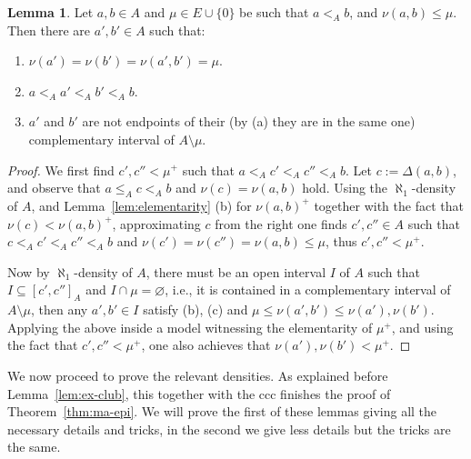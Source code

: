 \documentclass[10pt]{amsart}
\theoremstyle{definition}
\newtheorem{lemma}[theorem]{Lemma}
\theoremstyle{remark}
\newcommand{\es}{\varnothing}
\newcommand{\seb}{\subseteq}
\newcommand{\setm}{\setminus}
\newcommand{\1}{\mathbbm{1}}
\begin{document}
\begin{lemma}\label{lem:tech-lemma}
  Let $a,b \in A$ and $\mu \in E \cup \{0\}$ be such that
  $a <_{A} b$, and $\nu(a,b) \le \mu$. Then there are
  $a',b'\in A$ such that:
  \begin{enumerate}[label=(\alph*)]\itemsep0em
    \item $\nu(a') = \nu(b') = \nu(a',b') = \mu$.
    \item $a <_{A} a' <_{A} b' <_{A} b$.
    \item $a'$ and $b'$ are not endpoints of their
    (by (a) they are in the same one) complementary interval
    of $A \setm \mu$.
  \end{enumerate}
\end{lemma}
\begin{proof}
  We first find $c', c'' < \mu^{+}$ such that
  $a <_{A} c' <_{A} c'' <_{A} b$.
  Let $c := \Delta(a,b)$, and observe that $a \le_{A} c <_{A} b$ and
  $\nu(c) = \nu(a,b)$ hold.
  Using the $\aleph_{1}$-density of $A$, and Lemma~\ref{lem:elementarity} (b) for $\nu(a,b)^{+}$
  together with the fact that $\nu(c) < \nu(a,b)^{+}$, approximating $c$ from the right
  one finds
  $c',c'' \in A$ such that $c <_{A} c' <_{A} c'' <_{A} b$ and
  $\nu(c') = \nu(c'') = \nu(a,b) \le \mu$, thus $c',c'' < \mu^{+}$.

  Now by $\aleph_{1}$-density of $A$, there must be an open interval $I$ of $A$
  such that $I \seb [c',c'']_{A}$ and
  $I \cap \mu = \es$, i.e., it is contained in a complementary interval
  of $A \setm \mu$, then any $a',b' \in I$ satisfy (b), (c) and
  $\mu \le \nu(a',b') \le \nu(a'),\nu(b')$. Applying the above inside a
  model witnessing the elementarity of $\mu^{+}$, and using the
  fact that $c',c'' < \mu^{+}$, one also achieves
  that $\nu(a'),\nu(b') < \mu^{+}$.
\end{proof}

We now proceed to prove the relevant densities. As explained before
 Lemma~\ref{lem:ex-club}, this together with the ccc finishes the proof of
 Theorem~\ref{thm:ma-epi}. We will prove the first of these
lemmas giving all the necessary details and tricks, in the second
we give less details but the tricks are the same.
\end{document}
